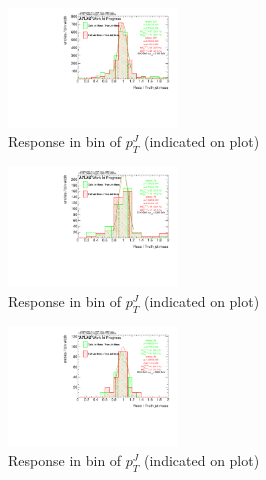 \begin{figure}

\includegraphics[width=0.4\textwidth]{appendixB/mTAS_Comb_Higgs_calibmCal_003ro_11:11:35-10-11-2016/8ResponsePTJ_h_JetRatio_mJ10CALO.pdf}
\caption{Response in bin of  $p_{T}^{J}$ (indicated on plot)} 

\end{figure}

\begin{figure}

\includegraphics[width=0.4\textwidth]{appendixB/mTAS_Comb_Higgs_calibmCal_003ro_11:11:35-10-11-2016/8ResponsePTJ_h_JetRatio_mJ11CALO.pdf}
\caption{Response in bin of  $p_{T}^{J}$ (indicated on plot)} 

\end{figure}

\begin{figure}

\includegraphics[width=0.4\textwidth]{appendixB/mTAS_Comb_Higgs_calibmCal_003ro_11:11:35-10-11-2016/8ResponsePTJ_h_JetRatio_mJ12CALO.pdf}
\caption{Response in bin of  $p_{T}^{J}$ (indicated on plot)} 

\end{figure}
